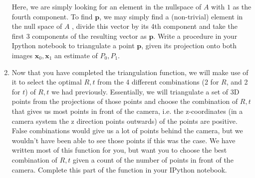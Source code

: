 \begin{enumerate}
    Here, we are simply looking for an element in the nullspace of $A$ with $1$ as the fourth component. To find $\mathbf{p}$, we may simply find a (non-trivial) element in the null space of $A$ , divide this vector by its 4th component and take the first 3 components of the resulting vector as $\mathbf{p}$.
    \newline
    \newline
    Write a procedure in your Ipython notebook to triangulate a point $\mathbf{p}$, given its projection onto both images $\mathbf{x}_0, \mathbf{x}_1$ an estimate of $P_0, P_1$.
    \sol{}
    
\item 
    Now that you have completed the triangulation function, we will make use of it to select the optimal $R, t$ from the 4 different combinations (2 for $R$, and 2 for $t$) of $R,t$ we had previously. \newline
    \newline
    Essentially, we will triangulate a set of 3D points from the projections of those points and choose the combination of $R,t$ that gives us most points in front of the camera, i.e. the z-coordinates (in a camera system the z direction points outwards)  of the points are positive. False combinations would give us a lot of points behind the camera, but we wouldn't have been able to see those points if this was the case.
    \newline
    \newline
    We have written most of this function for you, but want you to choose the best combination of $R,t$ given a count of the number of points in front of the camera. Complete this part of the function in your IPython notebook. 
    \newline
    
    \sol{}
    

\end{enumerate}
